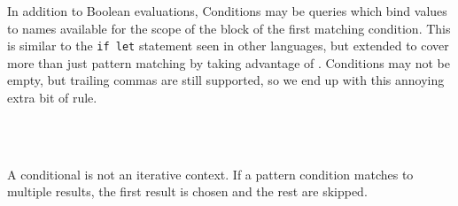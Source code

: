 In addition to Boolean evaluations, Conditions may be queries which bind
values to names available for the scope of the block of the first matching
condition. This is similar to the \texttt{if let} statement seen in other
languages, but extended to cover more than just pattern matching by taking
advantage of \Law{}. Conditions may not be empty, but trailing commas are
still supported, so we end up with this annoying extra bit of rule.

\begin{bnf*}
     \\
     \\
\end{bnf*}

A conditional is not an iterative context. If a pattern condition matches
to multiple results, the first result is chosen and the rest are skipped.

